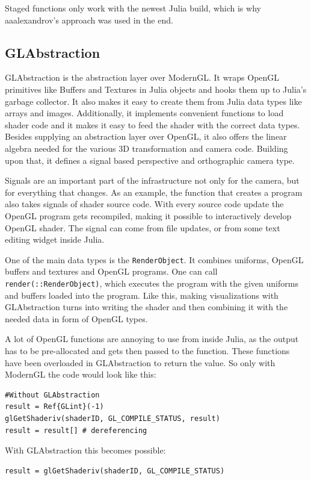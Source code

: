 Staged functions only work with the newest Julia build, which is why aaalexandrov’s approach was used in the end.


\subsection{GLAbstraction}
GLAbstraction is the abstraction layer over ModernGL.
It wraps \ac{OpenGL} primitives like Buffers and Textures in Julia objects and hooks them up to Julia's garbage collector. It also makes it easy to create them from Julia data types like arrays and images.
Additionally, it implements convenient functions to load shader code and it makes it easy to feed the shader with the correct data types.
Besides supplying an abstraction layer over \ac{OpenGL}, it also offers the linear algebra needed for the various 3D transformation and camera code.
Building upon that, it defines a signal based perspective and orthographic camera type.

Signals are an important part of the infrastructure not only for the camera, but for everything that changes.
As an example, the function that creates a program also takes signals of shader source code. 
With every source code update the OpenGL program gets recompiled, making it possible to interactively develop OpenGL shader. The signal can come from file updates, or from some text editing widget inside Julia.

One of the main data types is the \texttt{RenderObject}.
It combines uniforms, OpenGL buffers and textures and OpenGL programs. One can call \texttt{render(::RenderObject)}, which executes the program with the given uniforms and buffers loaded into the program. 
Like this, making visualizations with GLAbstraction turns into writing the shader and then combining it with the needed data in form of OpenGL types.

A lot of OpenGL functions are annoying to use from inside Julia, as the output has to be pre-allocated and gets then passed to the function.
These functions have been overloaded in GLAbstraction to return the value.
So only with ModernGL the code would look like this:
\begin{lstlisting}
#Without GLAbstraction
result = Ref{GLint}(-1)
glGetShaderiv(shaderID, GL_COMPILE_STATUS, result)
result = result[] # dereferencing
\end{lstlisting}
With GLAbstraction this becomes possible:
\begin{lstlisting}
result = glGetShaderiv(shaderID, GL_COMPILE_STATUS)
\end{lstlisting}

